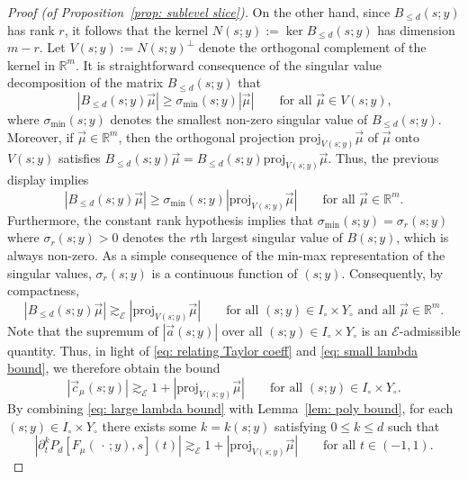 \documentclass[reqno]{amsart}
\numberwithin{equation}{section}
\newcommand{\R}{\mathbb{R}}
\newcommand{\sE}{\mathscr{E}}
\theoremstyle{plain}
\theoremstyle{definition}
\newcommand{\proj}{\mathrm{proj}}
\begin{document}
\begin{proof}[Proof (of Proposition~\ref{prop: sublevel slice})]
On the other hand, since $B_{\le d}(s;y)$ has rank $r$, it follows that the kernel $N(s;y) := \ker B_{\le d}(s;y)$ has dimension $m - r$. Let $V(s;y) := N(s;y)^{\perp}$ denote the orthogonal complement of the kernel in $\R^m$. It is straightforward consequence of the singular value decomposition of the matrix $B_{\le d}(s;y)$ that 
\begin{equation*}
|B_{\le d}(s;y) \vec{\mu}| \geq \sigma_{\min}(s;y)|\vec{\mu}| \qquad \textrm{for all $\vec{\mu} \in V(s;y)$,}
\end{equation*}
where $\sigma_{\min}(s;y)$ denotes the smallest non-zero singular value of $B_{\le d}(s;y)$. Moreover, if $\vec{\mu} \in \R^m$, then the orthogonal projection $\proj_{V(s;y)} \vec{\mu}$ of $\vec{\mu}$ onto $V(s;y)$ satisfies $B_{\le d}(s;y) \vec{\mu} = B_{\le d}(s;y) \proj_{V(s;y)} \vec{\mu}$. Thus, the previous display implies
\begin{equation*}
|B_{\le d}(s;y) \vec{\mu}| \geq \sigma_{\min}(s;y)|\proj_{V(s;y)}\vec{\mu}| \qquad \textrm{for all $\vec{\mu} \in \R^m$.}
\end{equation*}
Furthermore, the constant rank hypothesis implies that $\sigma_{\min}(s;y) = \sigma_r(s;y)$ where $\sigma_r(s;y) > 0$ denotes the $r$th largest singular value of $B(s;y)$, which is always non-zero. As a simple consequence of the min-max representation of the singular values, $\sigma_r(s;y)$ is a continuous function of $(s;y)$. Consequently, by compactness,
\begin{equation*}
   |B_{\le d}(s;y) \vec{\mu}| \gtrsim_{\sE} |\proj_{V(s;y)}\vec{\mu}| \qquad \textrm{for all $(s;y) \in I_{\circ} \times Y_{\circ}$ and all $\vec{\mu} \in \R^m$.} 
\end{equation*}
Note that the supremum of $|\vec{a}(s;y)|$ over all $(s;y) \in I_{\circ} \times Y_{\circ}$ is an $\sE$-admissible quantity. Thus, in light of \eqref{eq: relating Taylor coeff} and \eqref{eq: small lambda bound}, we therefore obtain the bound 
\begin{equation}\label{eq: large lambda bound}
    |\vec{c}_{\mu}(s;y)| \gtrsim_{\sE} 1 + |\proj_{V(s;y)}\vec{\mu}|  \qquad \textrm{for all $(s;y) \in I_{\circ} \times Y_{\circ}$.}
\end{equation}
 By combining \eqref{eq: large lambda bound} with Lemma~\ref{lem: poly bound}, for each $(s;y) \in I_{\circ} \times Y_{\circ}$ there exists some $k = k(s;y)$ satisfying $0 \leq k \leq d$ such that 
\begin{equation}\label{eq: leading term bound}
    |\partial_t^k P_d[F_{\mu}(\,\cdot\,;y),s](t)| \gtrsim_{\sE} 1 + |\proj_{V(s;y)}\vec{\mu}| \qquad \textrm{for all $t \in (-1,1)$.}
\end{equation}


\end{proof}
\end{document}
